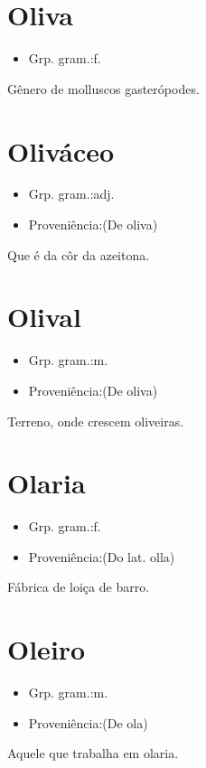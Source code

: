 \section{Oliva}
\begin{itemize}
\item {Grp. gram.:f.}
\end{itemize}
Gênero de molluscos gasterópodes.
\section{Oliváceo}
\begin{itemize}
\item {Grp. gram.:adj.}
\end{itemize}
\begin{itemize}
\item {Proveniência:(De \textunderscore oliva\textunderscore )}
\end{itemize}
Que é da côr da azeitona.
\section{Olival}
\begin{itemize}
\item {Grp. gram.:m.}
\end{itemize}
\begin{itemize}
\item {Proveniência:(De \textunderscore oliva\textunderscore )}
\end{itemize}
Terreno, onde crescem oliveiras.
\section{Olaria}
\begin{itemize}
\item {Grp. gram.:f.}
\end{itemize}
\begin{itemize}
\item {Proveniência:(Do lat. \textunderscore olla\textunderscore )}
\end{itemize}
Fábrica de loiça de barro.
\section{Oleiro}
\begin{itemize}
\item {Grp. gram.:m.}
\end{itemize}
\begin{itemize}
\item {Proveniência:(De \textunderscore ola\textunderscore )}
\end{itemize}
Aquele que trabalha em olaria.
